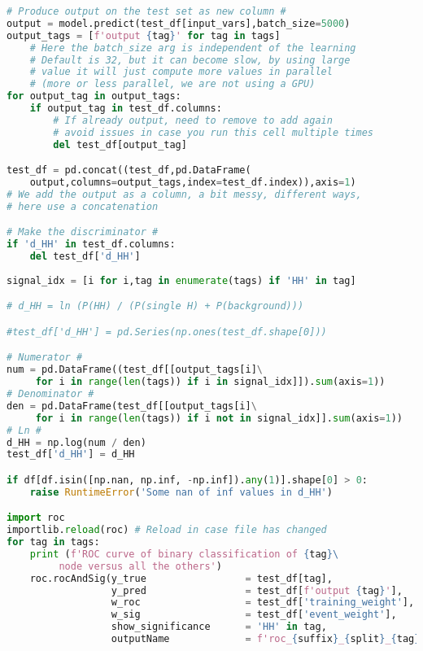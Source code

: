 \begin{lstlisting}[language=Python, caption=DNN setup for the \wwgg semi-leptonic final state, label={dnncode}]
# Produce output on the test set as new column #
output = model.predict(test_df[input_vars],batch_size=5000)
output_tags = [f'output {tag}' for tag in tags]
    # Here the batch_size arg is independent of the learning
    # Default is 32, but it can become slow, by using large 
    # value it will just compute more values in parallel
    # (more or less parallel, we are not using a GPU)
for output_tag in output_tags:
    if output_tag in test_df.columns:
        # If already output, need to remove to add again
        # avoid issues in case you run this cell multiple times
        del test_df[output_tag]

test_df = pd.concat((test_df,pd.DataFrame(
    output,columns=output_tags,index=test_df.index)),axis=1)
# We add the output as a column, a bit messy, different ways, 
# here use a concatenation

# Make the discriminator #
if 'd_HH' in test_df.columns:
    del test_df['d_HH']
    
signal_idx = [i for i,tag in enumerate(tags) if 'HH' in tag]

# d_HH = ln (P(HH) / (P(single H) + P(background)))

#test_df['d_HH'] = pd.Series(np.ones(test_df.shape[0]))

# Numerator #
num = pd.DataFrame((test_df[[output_tags[i]\
     for i in range(len(tags)) if i in signal_idx]]).sum(axis=1))
# Denominator #
den = pd.DataFrame(test_df[[output_tags[i]\
     for i in range(len(tags)) if i not in signal_idx]].sum(axis=1))
# Ln #
d_HH = np.log(num / den)
test_df['d_HH'] = d_HH

if df[df.isin([np.nan, np.inf, -np.inf]).any(1)].shape[0] > 0:
    raise RuntimeError('Some nan of inf values in d_HH')

import roc
importlib.reload(roc) # Reload in case file has changed
for tag in tags:
    print (f'ROC curve of binary classification of {tag}\
         node versus all the others')
    roc.rocAndSig(y_true                 = test_df[tag],
                  y_pred                 = test_df[f'output {tag}'],
                  w_roc                  = test_df['training_weight'],
                  w_sig                  = test_df['event_weight'],
                  show_significance      = 'HH' in tag,
                  outputName             = f'roc_{suffix}_{split}_{tag}.pdf')


\end{lstlisting}
